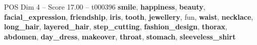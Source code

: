 \begin{textsample}{POS Dim 4 – Score 17.00 – t000396}  \label{ex:f4_pos_035}
\textbf{smile}, \textbf{happiness}, \textbf{beauty}, \textbf{facial\_expression}, \textbf{friendship}, \textbf{iris}, \textbf{tooth}, \textbf{jewellery}, fun, \textbf{waist}, \textbf{necklace}, \textbf{long\_hair}, \textbf{layered\_hair}, \textbf{step\_cutting}, \textbf{fashion\_design}, \textbf{thorax}, \textbf{abdomen}, \textbf{day\_dress}, \textbf{makeover}, \textbf{throat}, \textbf{stomach}, \textbf{sleeveless\_shirt}

\end{textsample}

